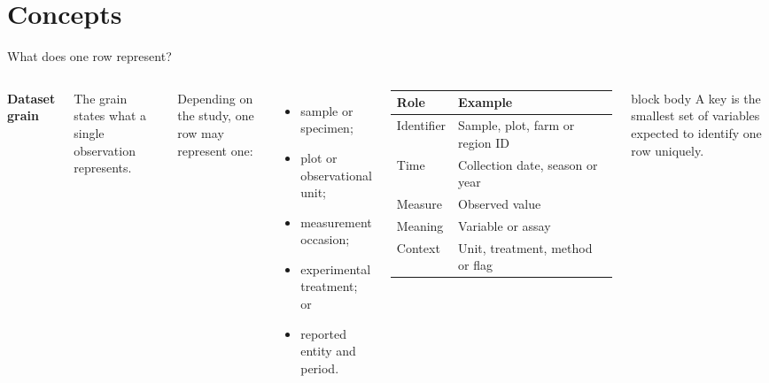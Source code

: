 \documentclass[10pt,aspectratio=169]{beamer}
\begin{document}
\section{Concepts}


\begin{frame}{What does one row represent?}

\small

\begin{columns}[T]


\textbf{Dataset grain}

The grain states what a single observation represents.

\vspace{0.20cm}

Depending on the study, one row may represent one:

\begin{itemize}
  \item sample or specimen;
  \item plot or observational unit;
  \item measurement occasion;
  \item experimental treatment; or
  \item reported entity and period.
\end{itemize}


\begin{tabularx}{\textwidth}{lX}
\toprule
\textbf{Role} & \textbf{Example} \\
\midrule
Identifier & Sample, plot, farm or region ID \\
Time & Collection date, season or year \\
Measure & Observed value \\
Meaning & Variable or assay \\
Context & Unit, treatment, method or flag \\
\bottomrule
\end{tabularx}

\vspace{0.35cm}

\begin{beamercolorbox}[rounded=true,sep=7pt]{block body}
A key is the smallest set of variables expected to identify one row uniquely.
\end{beamercolorbox}

\end{columns}

\end{frame}
\end{document}

